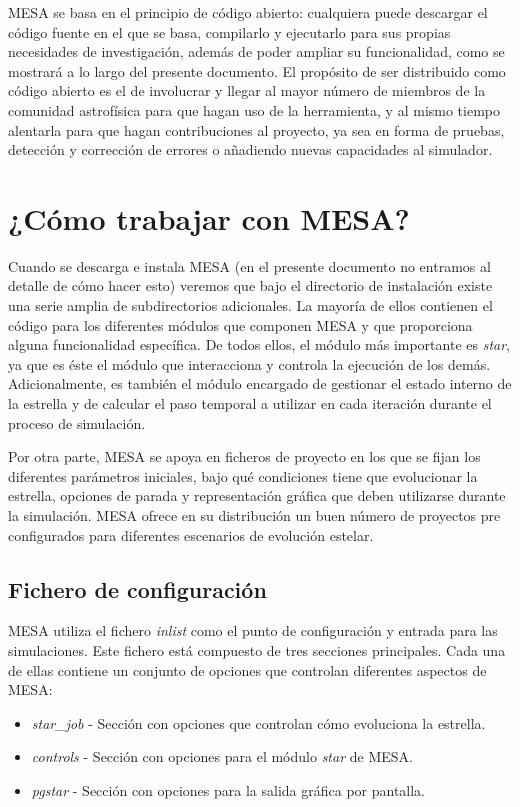 MESA se basa en el principio de código abierto: cualquiera puede descargar el código fuente en el que se basa, compilarlo y ejecutarlo para sus propias necesidades de investigación, además de poder ampliar su funcionalidad, como se mostrará a lo largo del presente documento. El propósito de ser distribuido como código abierto es el de involucrar y llegar al mayor número de miembros de la comunidad astrofísica para que hagan uso de la herramienta, y al mismo tiempo alentarla para que hagan contribuciones al proyecto, ya sea en forma de pruebas, detección y corrección de errores o añadiendo nuevas capacidades al simulador.\par

\section{¿Cómo trabajar con MESA?}
Cuando se descarga e instala MESA (en el presente documento no entramos al detalle de cómo hacer esto) veremos que bajo el directorio de instalación existe una serie amplia de subdirectorios adicionales. La mayoría de ellos contienen el código para los diferentes módulos que componen MESA y que proporciona alguna funcionalidad específica. De todos ellos, el módulo más importante es \textit{star}, ya que es éste el módulo que interacciona y controla la ejecución de los demás. Adicionalmente, es también el módulo encargado de gestionar el estado interno de la estrella y de calcular el paso temporal a utilizar en cada iteración durante el proceso de simulación.\par

Por otra parte, MESA se apoya en ficheros de proyecto en los que se fijan los diferentes parámetros iniciales, bajo qué condiciones tiene que evolucionar la estrella, opciones de parada y representación gráfica que deben utilizarse durante la simulación. MESA ofrece en su distribución un buen número de proyectos pre configurados para diferentes escenarios de evolución estelar.\par

\subsection{Fichero de configuración}
MESA utiliza el fichero \textit{inlist} como el punto de configuración y entrada para las simulaciones. Este fichero está compuesto de tres secciones principales. Cada una de ellas contiene un conjunto de opciones que controlan diferentes aspectos de MESA:
\begin{itemize}
    \item \textit{star\_job} - Sección con opciones que controlan cómo evoluciona la estrella.
    \item \textit{controls} - Sección con opciones para el módulo \textit{star} de MESA.
    \item \textit{pgstar} - Sección con opciones para la salida gráfica por pantalla.
\end{itemize}

